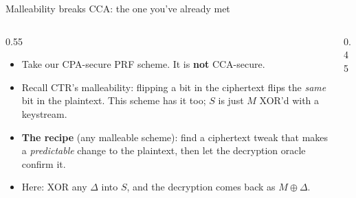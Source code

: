 \ifdefined\PRESENTATION\else\PassOptionsToClass{handout}{beamer}\fi\documentclass[aspectratio=169, lualatex]{beamer}
\begin{document}
\begin{frame}{Malleability breaks CCA: the one you've already met}
	\begin{columns}[c]
		\begin{column}{0.55\textwidth}
			\begin{itemize}
				\item Take our CPA-secure PRF scheme. It is \textbf{not} CCA-secure.
				\item Recall CTR's malleability: flipping a bit in the ciphertext flips the \emph{same} bit in the plaintext. This scheme has it too; $S$ is just $M$ XOR'd with a keystream.
				\item \textbf{The recipe} (any malleable scheme): find a ciphertext tweak that makes a \emph{predictable} change to the plaintext, then let the decryption oracle confirm it.
				\item Here: XOR any $\Delta$ into $S$, and the decryption comes back as $M \oplus \Delta$.
			\end{itemize}
		\end{column}
		\begin{column}{0.45\textwidth}
		\end{column}
	\end{columns}
\end{frame}
\end{document}
